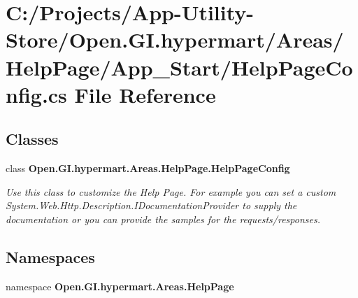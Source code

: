 \section{C\+:/\+Projects/\+App-\/\+Utility-\/\+Store/\+Open.G\+I.\+hypermart/\+Areas/\+Help\+Page/\+App\+\_\+\+Start/\+Help\+Page\+Config.cs File Reference}
\label{_help_page_config_8cs}
\subsection*{Classes}
\begin{DoxyCompactItemize}
\item 
class {\bfseries Open.\+G\+I.\+hypermart.\+Areas.\+Help\+Page.\+Help\+Page\+Config}
\begin{DoxyCompactList}\small\item\em Use this class to customize the Help Page. For example you can set a custom System.\+Web.\+Http.\+Description.\+I\+Documentation\+Provider to supply the documentation or you can provide the samples for the requests/responses. \end{DoxyCompactList}\end{DoxyCompactItemize}
\subsection*{Namespaces}
\begin{DoxyCompactItemize}
\item 
namespace \textbf{ Open.\+G\+I.\+hypermart.\+Areas.\+Help\+Page}
\end{DoxyCompactItemize}

